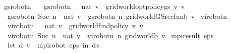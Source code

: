 \begin{isabellebody}
\isanewline
{}\isamarkupfalse%
\ gs{\isacharunderscore}{\kern0pt}robot{\isacharunderscore}{\kern0pt}n\ \isanewline
\ \ {\isachardoublequoteopen}gs{\isacharunderscore}{\kern0pt}robot{\isacharunderscore}{\kern0pt}n\ {\isacharparenleft}{\kern0pt}{}\ {\isacharcolon}{\kern0pt}{\isacharcolon}{\kern0pt}\ nat{\isacharparenright}{\kern0pt}\ v\ {\isacharequal}{\kern0pt}\ {\isacharparenleft}{\kern0pt}gridworld{\isacharunderscore}{\kern0pt}opt{\isacharunderscore}{\kern0pt}policy{\isacharunderscore}{\kern0pt}gs\ v{\isacharcomma}{\kern0pt}\ v{\isacharparenright}{\kern0pt}{\isachardoublequoteclose}\ {\isacharbar}{\kern0pt}\isanewline
\ \ {\isachardoublequoteopen}gs{\isacharunderscore}{\kern0pt}robot{\isacharunderscore}{\kern0pt}n\ {\isacharparenleft}{\kern0pt}Suc\ n\ {\isacharcolon}{\kern0pt}{\isacharcolon}{\kern0pt}\ nat{\isacharparenright}{\kern0pt}\ v\ {\isacharequal}{\kern0pt}\ gs{\isacharunderscore}{\kern0pt}robot{\isacharunderscore}{\kern0pt}n\ n\ {\isacharparenleft}{\kern0pt}gridworld{\isacharunderscore}{\kern0pt}GS{\isacharunderscore}{\kern0pt}rec{\isacharunderscore}{\kern0pt}fun\isactrlsub b\ v{\isacharparenright}{\kern0pt}{\isachardoublequoteclose}\isanewline
\isanewline
{}\isamarkupfalse%
\ vi{\isacharunderscore}{\kern0pt}robot{\isacharunderscore}{\kern0pt}n\ \isanewline
\ \ {\isachardoublequoteopen}vi{\isacharunderscore}{\kern0pt}robot{\isacharunderscore}{\kern0pt}n\ {\isacharparenleft}{\kern0pt}{}\ {\isacharcolon}{\kern0pt}{\isacharcolon}{\kern0pt}\ nat{\isacharparenright}{\kern0pt}\ v\ {\isacharequal}{\kern0pt}\ {\isacharparenleft}{\kern0pt}gridworld{\isacharunderscore}{\kern0pt}find{\isacharunderscore}{\kern0pt}policy{\isacharprime}{\kern0pt}\ v{\isacharcomma}{\kern0pt}\ v{\isacharparenright}{\kern0pt}{\isachardoublequoteclose}\ {\isacharbar}{\kern0pt}\isanewline
\ \ {\isachardoublequoteopen}vi{\isacharunderscore}{\kern0pt}robot{\isacharunderscore}{\kern0pt}n\ {\isacharparenleft}{\kern0pt}Suc\ n\ {\isacharcolon}{\kern0pt}{\isacharcolon}{\kern0pt}\ nat{\isacharparenright}{\kern0pt}\ v\ {\isacharequal}{\kern0pt}\ vi{\isacharunderscore}{\kern0pt}robot{\isacharunderscore}{\kern0pt}n\ n\ {\isacharparenleft}{\kern0pt}gridworld{\isacharunderscore}{\kern0pt}{\isasymL}\isactrlsub b\ v{\isacharparenright}{\kern0pt}{\isachardoublequoteclose}\isanewline
\isanewline
{}\isamarkupfalse%
\ {\isachardoublequoteopen}mpi{\isacharunderscore}{\kern0pt}result\ eps\ {\isacharequal}{\kern0pt}\ \isanewline
\ \ {\isacharparenleft}{\kern0pt}let\ {\isacharparenleft}{\kern0pt}d{\isacharcomma}{\kern0pt}\ v{\isacharparenright}{\kern0pt}\ {\isacharequal}{\kern0pt}\ mpi{\isacharunderscore}{\kern0pt}robot\ eps\ in\ {\isacharparenleft}{\kern0pt}d{\isacharcomma}{\kern0pt}v{\isacharparenright}{\kern0pt}{\isacharparenright}{\kern0pt}{\isachardoublequoteclose}\isanewline

\end{isabellebody}
